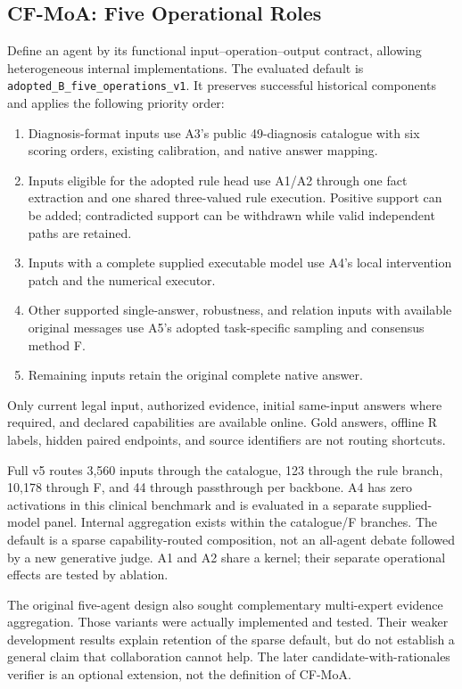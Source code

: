 \documentclass[11pt,a4paper]{article}
\begin{document}
\subsection{CF-MoA: Five Operational Roles}
Define an agent by its functional input--operation--output contract, allowing heterogeneous internal implementations. The evaluated default is \texttt{adopted\_B\_five\_operations\_v1}. It preserves successful historical components and applies the following priority order:
\begin{enumerate}
\item Diagnosis-format inputs use A3's public 49-diagnosis catalogue with six scoring orders, existing calibration, and native answer mapping.
\item Inputs eligible for the adopted rule head use A1/A2 through one fact extraction and one shared three-valued rule execution. Positive support can be added; contradicted support can be withdrawn while valid independent paths are retained.
\item Inputs with a complete supplied executable model use A4's local intervention patch and the numerical executor.
\item Other supported single-answer, robustness, and relation inputs with available original messages use A5's adopted task-specific sampling and consensus method F.
\item Remaining inputs retain the original complete native answer.
\end{enumerate}
Only current legal input, authorized evidence, initial same-input answers where required, and declared capabilities are available online. Gold answers, offline R labels, hidden paired endpoints, and source identifiers are not routing shortcuts.

Full v5 routes 3,560 inputs through the catalogue, 123 through the rule branch, 10,178 through F, and 44 through passthrough per backbone. A4 has zero activations in this clinical benchmark and is evaluated in a separate supplied-model panel. Internal aggregation exists within the catalogue/F branches. The default is a sparse capability-routed composition, not an all-agent debate followed by a new generative judge. A1 and A2 share a kernel; their separate operational effects are tested by ablation.

The original five-agent design also sought complementary multi-expert evidence aggregation. Those variants were actually implemented and tested. Their weaker development results explain retention of the sparse default, but do not establish a general claim that collaboration cannot help. The later candidate-with-rationales verifier is an optional extension, not the definition of CF-MoA.
\end{document}
